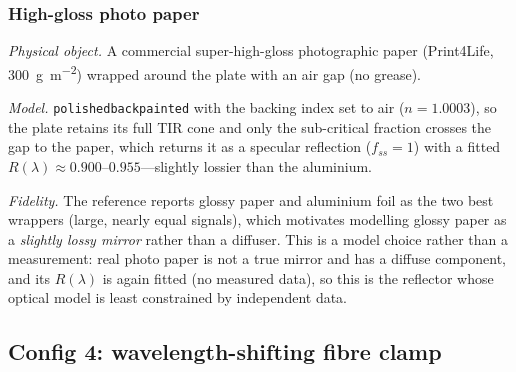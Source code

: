 \documentclass[11pt,a4paper]{article}
\begin{document}
\subsubsection{High-gloss photo paper}
\label{sec:refl-glossy}

\emph{Physical object.} A commercial super-high-gloss photographic paper
(Print4Life, \SI{300}{\gram\per\square\meter}) wrapped around the plate with an
air gap (no grease).

\emph{Model.} \texttt{polishedbackpainted} with the backing index set to air
($n=1.0003$), so the plate retains its full TIR cone and only the sub-critical
fraction crosses the gap to the paper, which returns it as a specular reflection
($f_{ss}=1$) with a fitted $R(\lambda)\approx 0.900$--$0.955$---slightly lossier
than the aluminium.

\emph{Fidelity.} The reference reports glossy paper and aluminium foil as the two
best wrappers (large, nearly equal signals), which motivates modelling glossy
paper as a \emph{slightly lossy mirror} rather than a diffuser. This is a model
choice rather than a measurement: real photo paper is not a true mirror and has
a diffuse component, and its $R(\lambda)$ is again fitted (no measured data),
so this is the reflector whose optical model is least constrained by independent
data.

\subsection{Config 4: wavelength-shifting fibre clamp}
\label{sec:wls}
\end{document}
